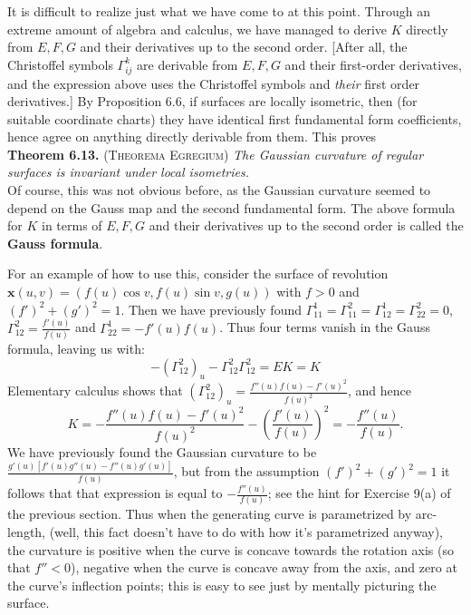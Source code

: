 \documentclass[leqno]{book}
\begin{document}
It is difficult to realize just what we have come to at this point.  Through an extreme amount of algebra and calculus, we have managed to derive $K$ directly from $E,F,G$ and their derivatives up to the second order.  [After all, the Christoffel symbols $\Gamma_{ij}^k$ are derivable from $E,F,G$ and their first-order derivatives, and the expression above uses the Christoffel symbols and \emph{their} first order derivatives.]  By Proposition 6.6, if surfaces are locally isometric, then (for suitable coordinate charts) they have identical first fundamental form coefficients, hence agree on anything directly derivable from them.  This proves\\

\noindent\textbf{Theorem 6.13.} \textsc{(Theorema Egregium)} \emph{The Gaussian curvature of regular surfaces is invariant under local isometries.}\\

\noindent Of course, this was not obvious before, as the Gaussian curvature seemed to depend on the Gauss map and the second fundamental form.  The above formula for $K$ in terms of $E,F,G$ and their derivatives up to the second order is called the \textbf{Gauss formula}.

For an example of how to use this, consider the surface of revolution $\mathbf x(u,v)=(f(u)\cos v,f(u)\sin v,g(u))$ with $f>0$ and $(f')^2+(g')^2=1$. %
Then we have previously found $\Gamma_{11}^1=\Gamma_{11}^2=\Gamma_{12}^1=\Gamma_{22}^2=0$, $\Gamma_{12}^2=\frac{f'(u)}{f(u)}$ and $\Gamma_{22}^1=-f'(u)f(u)$.  Thus four terms vanish in the Gauss formula, leaving us with:
$$-(\Gamma_{12}^2)_u-\Gamma_{12}^2\Gamma_{12}^2=EK=K$$
Elementary calculus shows that $(\Gamma_{12}^2)_u=\frac{f''(u)f(u)-f'(u)^2}{f(u)^2}$, and hence
$$K=-\frac{f''(u)f(u)-f'(u)^2}{f(u)^2}-\left(\frac{f'(u)}{f(u)}\right)^2=-\frac{f''(u)}{f(u)}.$$
We have previously found the Gaussian curvature to be $\frac{g'(u)[f'(u)g''(u)-f''(u)g'(u)]}{f(u)}$, but from the assumption $(f')^2+(g')^2=1$ it follows that that expression is equal to $-\frac{f''(u)}{f(u)}$; see the hint for Exercise 9(a) of the previous section.  Thus when the generating curve is parametrized by arc-length, (well, this fact doesn't have to do with how it's parametrized anyway), the curvature is positive when the curve is concave towards the rotation axis (so that $f''<0$), negative when the curve is concave away from the axis, and zero at the curve's inflection points; this is easy to see just by mentally picturing the surface.
\end{document}

